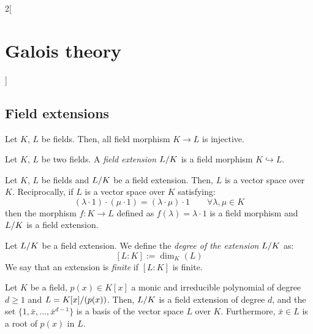 \documentclass[../../../main.tex]{subfiles}
\begin{document}
\begin{multicols}{2}[\section{Galois theory}]
  \subsection{Field extensions}
  \begin{prop}
    Let $K$, $L$ be fields. Then, all field morphism $K\rightarrow L$ is injective.
  \end{prop}
  \begin{definition}
    Let $K$, $L$ be two fields. A \textit{field extension $\quot{L}{K}$} is a field morphism $K\hookrightarrow L$.
  \end{definition}
  \begin{prop}
    Let $K$, $L$ be fields and $\quot{L}{K}$ be a field extension. Then, $L$ is a vector space over $K$. Reciprocally, if $L$ is a vector space over $K$ satisfying: $$(\lambda\cdot 1)\cdot(\mu\cdot 1)=(\lambda\cdot\mu)\cdot 1\qquad\forall\lambda,\mu\in K$$ then the morphism $f:K\rightarrow L$ defined as $f(\lambda)=\lambda\cdot 1$ is a field morphism and $\quot{L}{K}$ is a field extension.
  \end{prop}
  \begin{definition}
    Let $\quot{L}{K}$ be a field extension. We define the \textit{degree of the extension $\quot{L}{K}$} as: $$[L:K]:=\dim_K(L)$$ We say that an extension is \textit{finite} if $[L:K]$ is finite.
  \end{definition}
  \begin{prop}
    Let $K$ be a field, $p(x)\in K[x]$ a monic and irreducible polynomial of degree $d\geq 1$ and $L=\quot{K[x]}{(p(x))}$. Then, $\quot{L}{K}$ is a field extension of degree $d$, and the set $\{1,\bar{x},\ldots,\bar{x}^{d-1}\}$ is a basis of the vector space $L$ over $K$. Furthermore, $\bar{x}\in L$ is a root of $p(x)$ in $L$.
  \end{prop}

\end{multicols}
\end{document}
